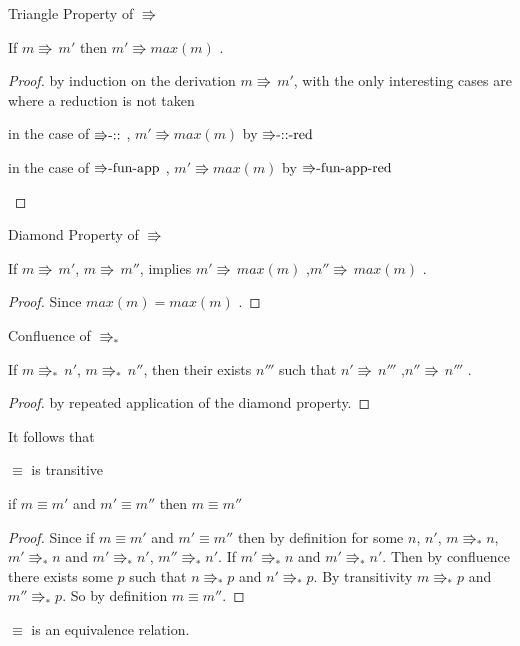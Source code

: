 \begin{lem}
Triangle Property of $\Rrightarrow$

If $m\Rrightarrow\,m'$ then $m'\Rrightarrow max\left(m\right)$ .
\end{lem}

\begin{proof}
by induction on the derivation $m\Rrightarrow\,m'$, with the only
interesting cases are where a reduction is not taken
\begin{casenv}
\item in the case of $\textrm{\ensuremath{\Rrightarrow}-::}$ , $m'\Rrightarrow max\left(m\right)$
by $\textrm{\ensuremath{\Rrightarrow}-::-red}$
\item in the case of $\textrm{\ensuremath{\Rrightarrow}-fun-app}$ , $m'\Rrightarrow max\left(m\right)$
by $\textrm{\ensuremath{\Rrightarrow}-fun-app-red}$ 
\end{casenv}
\end{proof}
\begin{lem}
Diamond Property of $\Rrightarrow$

If $m\Rrightarrow\,m'$, $m\Rrightarrow\,m''$, implies $m'\Rrightarrow\,max\left(m\right)$
,$m''\Rrightarrow\,max\left(m\right)$ . 
\end{lem}

\begin{proof}
Since $max\left(m\right)=max\left(m\right)$ . 
\end{proof}
\begin{thm}
Confluence of $\Rrightarrow_{\ast}$ 

If $m\Rrightarrow_{\ast}\,n'$, $m\Rrightarrow_{\ast}\,n''$, then
their exists $n'''$ such that $n'\Rrightarrow\,n'''$ ,$n''\Rrightarrow\,n'''$
.
\end{thm}

\begin{proof}
by repeated application of the diamond property.
\end{proof}
It follows that
\begin{thm}
$\equiv$ is transitive

if $m\equiv m'$ and $m'\equiv m''$ then $m\equiv m''$
\end{thm}

\begin{proof}
Since if $m\equiv m'$ and $m'\equiv m''$ then by definition for some $n$, $n'$, $m\Rrightarrow_{\ast}n$, $m'\Rrightarrow_{\ast}n$ and $m'\Rrightarrow_{\ast}n'$, $m''\Rrightarrow_{\ast}n'$. If $m'\Rrightarrow_{\ast}n$ and $m'\Rrightarrow_{\ast}n'$.
Then by confluence there exists some $p$ such that $n\Rrightarrow_{\ast}p$ and $n'\Rrightarrow_{\ast}p$.
By transitivity $m\Rrightarrow_{\ast}p$ and $m''\Rrightarrow_{\ast}p$.
So by definition $m\equiv m''$.
\end{proof}
\begin{fact}
$\equiv$ is an equivalence relation.
\end{fact}


